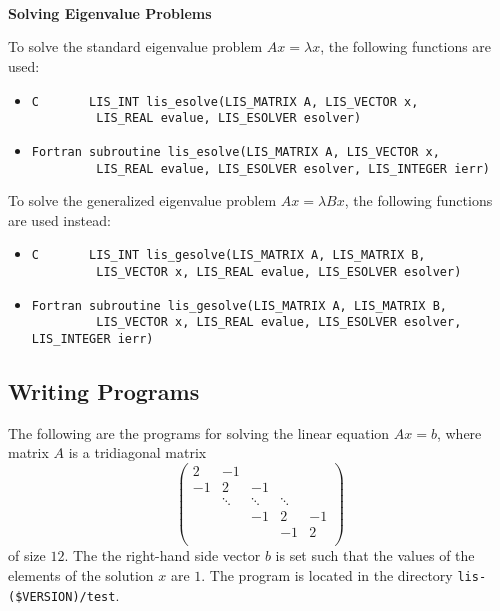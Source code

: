 \documentclass[a4paper]{article}
\begin{document}
\\ \\ \\
\noindent
{\bf Solving Eigenvalue Problems}

To solve the standard eigenvalue problem $Ax = \lambda x$, the following functions are used:
\begin{itemize}
\item \verb|C       LIS_INT lis_esolve(LIS_MATRIX A, LIS_VECTOR x,|\\ 
      \verb|         LIS_REAL evalue, LIS_ESOLVER esolver)|
\item \verb|Fortran subroutine lis_esolve(LIS_MATRIX A, LIS_VECTOR x,|\\
      \verb|         LIS_REAL evalue, LIS_ESOLVER esolver, LIS_INTEGER ierr)|
\end{itemize}
To solve the generalized eigenvalue problem $Ax = \lambda Bx$, the following functions are used instead:
\begin{itemize}
\item \verb|C       LIS_INT lis_gesolve(LIS_MATRIX A, LIS_MATRIX B,|\\ 
      \verb|         LIS_VECTOR x, LIS_REAL evalue, LIS_ESOLVER esolver)|
\item \verb|Fortran subroutine lis_gesolve(LIS_MATRIX A, LIS_MATRIX B,|\\
      \verb|         LIS_VECTOR x, LIS_REAL evalue, LIS_ESOLVER esolver, LIS_INTEGER ierr)|
\end{itemize}

\subsection{Writing Programs}
\label{sec:testprog3}
The following are the programs for solving the linear equation $Ax = b$,
where matrix $A$ is a tridiagonal matrix 
\[
\left(
\begin{array}{ccccc}
2 & -1 &   &  &   \\
-1 & 2 & -1 &  &   \\
  & \ddots  & \ddots  & \ddots  &   \\
  &   & -1 & 2 & -1 \\
  &   &   & -1 & 2 \\
\end{array}
\right)
\]
of size $12$.
The the right-hand side vector $b$ is set such that the values of the elements of the solution $x$ are $1$. 
The program is located in the directory \verb|lis-($VERSION)/test|. 
\end{document}
